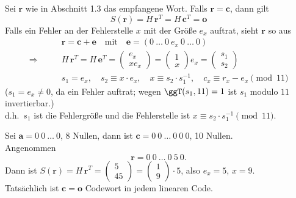 Sei $\mathbf{r}$ wie in Abschnitt 1.3 das empfangene Wort. Falls $\mathbf{r} = \mathbf{c}$, dann gilt
\[
  S(\mathbf{r}) = H\,\mathbf{r}^T = H\,\mathbf{c}^T = \mathbf{o}
\]
Falls ein Fehler an der Fehlerstelle $x$ mit der Größe $e_x$ auftrat, sieht $\mathbf{r}$ so aus
\begin{align*}
  & \mathbf{r} = \mathbf{c} + \mathbf{e} \quad\text{mit}\quad \mathbf{e} = (0\ \dots\ 0\ e_x\ 0\ \dots\ 0)\\
  \Rightarrow\qquad & H\,\mathbf{r}^T = H\,\mathbf{e}^T = \begin{pmatrix} e_x\\ x e_x \end{pmatrix}
    = \begin{pmatrix} 1\\ x \end{pmatrix} e_x = \begin{pmatrix} s_1\\ s_2 \end{pmatrix}\\
  & s_1 = e_x,\quad s_2 \equiv x \cdot e_x,\quad x \equiv s_2 \cdot s_1^{-1},\quad c_x \equiv r_x - e_x \pmod{11}
\end{align*}
($s_1 = e_x \neq 0$, da ein Fehler auftrat; wegen $\ggT(s_1, 11) = 1$ ist $s_1$ modulo $11$ invertierbar.)\\
d.h.\ $s_1$ ist die Fehlergröße und die Fehlerstelle ist $x \equiv s_2 \cdot s_1^{-1} \pmod{11}$.

\begin{beispiel}
Sei $\mathbf{a} = 0\ 0\ \dots\ 0$, 8 Nullen, dann ist $\mathbf{c} = 0\ 0\ \dots\ 0\ 0\ 0$, 10 Nullen.\\
Angenommen
\[ \mathbf{r} = 0\ 0\ \dots\ 0\ 5\ 0. \]
Dann ist $S(\mathbf{r}) = H\,\mathbf{r}^T = \begin{pmatrix} 5\\ 45 \end{pmatrix} = \begin{pmatrix} 1\\ 9 \end{pmatrix} \cdot 5$, also $e_x = 5$, $x = 9$.\\
Tatsächlich ist $\mathbf{c} = \mathbf{o}$ Codewort in jedem linearen Code.
\end{beispiel}


